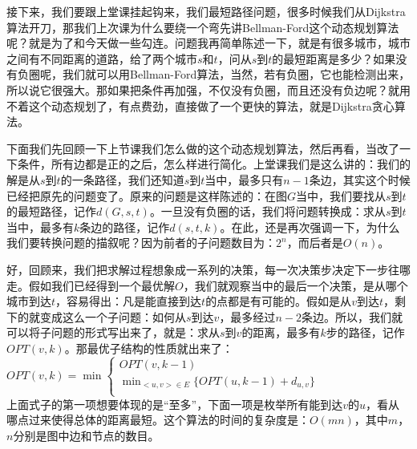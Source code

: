 	接下来，我们要跟上堂课挂起钩来，我们最短路径问题，很多时候我们从Dijkstra算法开刀，那我们上次课为什么要绕一个弯先讲Bellman-Ford这个动态规划算法呢？就是为了和今天做一些勾连。问题我再简单陈述一下，就是有很多城市，城市之间有不同距离的道路，给了两个城市$s$和$t$，问从$s$到$t$的最短距离是多少？如果没有负圈呢，我们就可以用Bellman-Ford算法，当然，若有负圈，它也能检测出来，所以说它很强大。那如果把条件再加强，不仅没有负圈，而且还没有负边呢？就用不着这个动态规划了，有点费劲，直接做了一个更快的算法，就是Dijkstra贪心算法。
	
	下面我们先回顾一下上节课我们怎么做的这个动态规划算法，然后再看，当改了一下条件，所有边都是正的之后，怎么样进行简化。上堂课我们是这么讲的：我们的解是从$s$到$t$的一条路径，我们还知道$s$到$t$当中，最多只有$n-1$条边，其实这个时候已经把原先的问题变了。原来的问题是这样陈述的：在图$G$当中，我们要找从$s$到$t$的最短路径，记作$d(G,s,t)$。一旦没有负圈的话，我们将问题转换成：求从$s$到$t$当中，最多有$k$条边的路径，记作$d(s,t,k)$。在此，还是再次强调一下，为什么我们要转换问题的描叙呢？因为前者的子问题数目为：$2^n$，而后者是$O(n)$。
	
	好，回顾来，我们把求解过程想象成一系列的决策，每一次决策步决定下一步往哪走。假如我们已经得到一个最优解$O$，我们就观察当中的最后一个决策，是从哪个城市到达$t$，容易得出：凡是能直接到达$t$的点都是有可能的。假如是从$v$到达$t$，剩下的就变成这么一个子问题：如何从$s$到达$v$，最多经过$n-2$条边。所以，我们就可以将子问题的形式写出来了，就是：求从$s$到$v$的距离，最多有$k$步的路径，记作$OPT(v,k)$。那最优子结构的性质就出来了：
	 $OPT(v, k) = \min \begin{cases} 
	 OPT( v, k-1 ) \\
	 {\min_{<u,v>\in E}} \{ OPT( u, k-1) + d_{u, v}  \} \\
	 \end{cases}  $\\
	 上面式子的第一项想要体现的是“至多”，下面一项是枚举所有能到达$v$的$u$，看从哪点过来使得总体的距离最短。这个算法的时间的复杂度是：$O(mn)$，其中$m$，$n$分别是图中边和节点的数目。
	 
